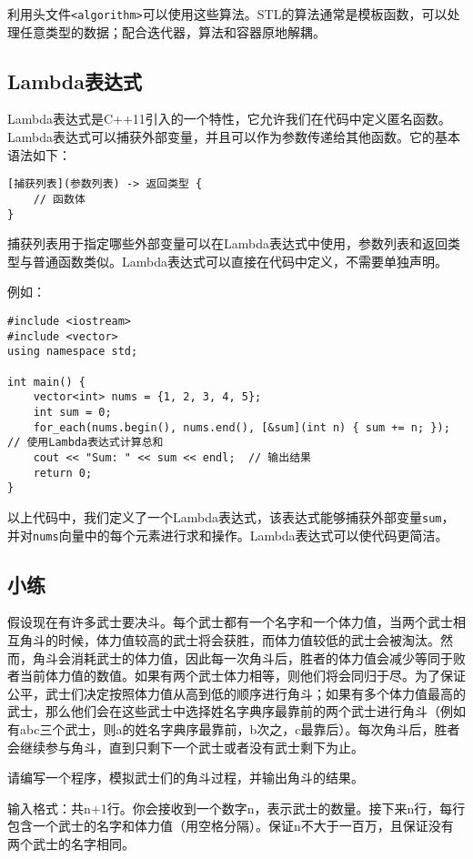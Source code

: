 \documentclass[../main.tex]{subfiles}
\begin{document}
利用头文件\texttt{<algorithm>}可以使用这些算法。STL的算法通常是模板函数，可以处理任意类型的数据；配合迭代器，算法和容器原地解耦。

\subsection{Lambda表达式}

Lambda表达式是C++11引入的一个特性，它允许我们在代码中定义匿名函数。Lambda表达式可以捕获外部变量，并且可以作为参数传递给其他函数。它的基本语法如下：
\begin{lstlisting}
[捕获列表](参数列表) -> 返回类型 {
    // 函数体
}
\end{lstlisting}
捕获列表用于指定哪些外部变量可以在Lambda表达式中使用，参数列表和返回类型与普通函数类似。Lambda表达式可以直接在代码中定义，不需要单独声明。

例如：
\begin{lstlisting}
#include <iostream>
#include <vector>
using namespace std;

int main() {
    vector<int> nums = {1, 2, 3, 4, 5};
    int sum = 0;
    for_each(nums.begin(), nums.end(), [&sum](int n) { sum += n; });  // 使用Lambda表达式计算总和
    cout << "Sum: " << sum << endl;  // 输出结果
    return 0;
}
\end{lstlisting}
以上代码中，我们定义了一个Lambda表达式，该表达式能够捕获外部变量\texttt{sum}，并对\texttt{nums}向量中的每个元素进行求和操作。Lambda表达式可以使代码更简洁。

\subsection{小练}

假设现在有许多武士要决斗。每个武士都有一个名字和一个体力值，当两个武士相互角斗的时候，体力值较高的武士将会获胜，而体力值较低的武士会被淘汰。然而，角斗会消耗武士的体力值，因此每一次角斗后，胜者的体力值会减少等同于败者当前体力值的数值。如果有两个武士体力相等，则他们将会同归于尽。为了保证公平，武士们决定按照体力值从高到低的顺序进行角斗；如果有多个体力值最高的武士，那么他们会在这些武士中选择姓名字典序最靠前的两个武士进行角斗（例如有abc三个武士，则a的姓名字典序最靠前，b次之，c最靠后）。每次角斗后，胜者会继续参与角斗，直到只剩下一个武士或者没有武士剩下为止。

请编写一个程序，模拟武士们的角斗过程，并输出角斗的结果。

输入格式：共n+1行。你会接收到一个数字n，表示武士的数量。接下来n行，每行包含一个武士的名字和体力值（用空格分隔）。保证n不大于一百万，且保证没有两个武士的名字相同。
\end{document}
